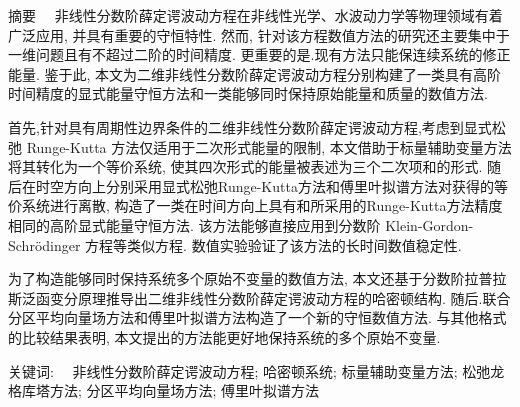 
\begin{ChineseAbstract}[***]%
\item {\heiti 摘要\ \ }
非线性分数阶薛定谔波动方程在非线性光学、水波动力学等物理领域有着广泛应用, 并具有重要的守恒特性. 然而, 针对该方程数值方法的研究还主要集中于一维问题且有不超过二阶的时间精度. 更重要的是.现有方法只能保连续系统的修正能量. 鉴于此, 本文为二维非线性分数阶薛定谔波动方程分别构建了一类具有高阶时间精度的显式能量守恒方法和一类能够同时保持原始能量和质量的数值方法.  

首先,针对具有周期性边界条件的二维非线性分数阶薛定谔波动方程,考虑到显式松弛 Runge-Kutta 方法仅适用于二次形式能量的限制, 本文借助于标量辅助变量方法将其转化为一个等价系统, 使其四次形式的能量被表述为三个二次项和的形式. 随后在时空方向上分别采用显式松弛Runge-Kutta方法和傅里叶拟谱方法对获得的等价系统进行离散, 构造了一类在时间方向上具有和所采用的Runge-Kutta方法精度相同的高阶显式能量守恒方法. 该方法能够直接应用到分数阶 Klein-Gordon-Schr{\"o}dinger 方程等类似方程. 数值实验验证了该方法的长时间数值稳定性.

为了构造能够同时保持系统多个原始不变量的数值方法, 本文还基于分数阶拉普拉斯泛函变分原理推导出二维非线性分数阶薛定谔波动方程的哈密顿结构. 随后.联合分区平均向量场方法和傅里叶拟谱方法构造了一个新的守恒数值方法. 与其他格式的比较结果表明, 本文提出的方法能更好地保持系统的多个原始不变量.


\item {\heiti 关键词:\ \ } 非线性分数阶薛定谔波动方程; 哈密顿系统; 标量辅助变量方法; 松弛龙格库塔方法; 分区平均向量场方法; 傅里叶拟谱方法
\end{ChineseAbstract}
